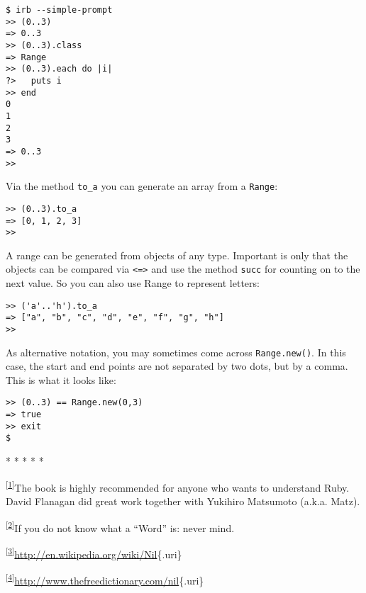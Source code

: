 \documentclass[a4paper]{book}
\begin{document}
\begin{shaded}\begin{verbatim}
$ irb --simple-prompt
>> (0..3)
=> 0..3
>> (0..3).class
=> Range
>> (0..3).each do |i|
?>   puts i
>> end
0
1
2
3
=> 0..3
>>
\end{verbatim}\end{shaded}

Via the method \texttt{to\_a} you can generate an array from a \texttt{Range}:

\begin{shaded}\begin{verbatim}
>> (0..3).to_a
=> [0, 1, 2, 3]
>>
\end{verbatim}\end{shaded}

A range can be generated from objects of any type. Important is only that the objects can be compared via \texttt{\textless{}=\textgreater{}} and use the method \texttt{succ} for counting on to the next value. So you can also use Range to represent letters:

\begin{shaded}\begin{verbatim}
>> ('a'..'h').to_a
=> ["a", "b", "c", "d", "e", "f", "g", "h"]
>>
\end{verbatim}\end{shaded}

As alternative notation, you may sometimes come across \texttt{Range.new()}. In this case, the start and end points are not separated by two dots, but by a comma. This is what it looks like:

\begin{shaded}\begin{verbatim}
>> (0..3) == Range.new(0,3)
=> true
>> exit
$
\end{verbatim}\end{shaded}

* * * * *

\textsuperscript{{[}\hyperref[idp1281296]{1}{]}}The book is highly recommended for anyone who wants to understand Ruby. David Flanagan did great work together with Yukihiro Matsumoto (a.k.a. Matz).

\textsuperscript{{[}\hyperref[idp2247056]{2}{]}}If you do not know what a “Word” is: never mind.

\textsuperscript{{[}\hyperref[idp2283568]{3}{]}}\url{http://en.wikipedia.org/wiki/Nil}\{.uri\}

\textsuperscript{{[}\hyperref[idp2285664]{4}{]}}\url{http://www.thefreedictionary.com/nil}\{.uri\}
\end{document}
